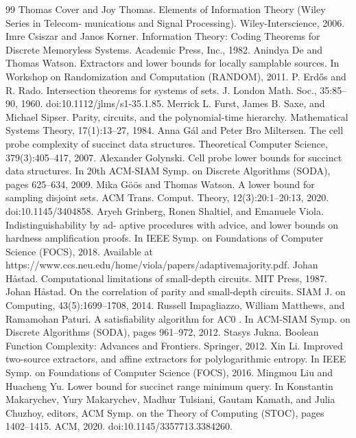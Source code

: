 \begin{thebibliography}{99}
 Thomas Cover and Joy Thomas. Elements of Information Theory (Wiley Series in Telecom- munications and Signal Processing). Wiley-Interscience, 2006.
 Imre Csiszar and Janos Korner. Information Theory: Coding Theorems for Discrete Memoryless Systems. Academic Press, Inc., 1982.
 Anindya De and Thomas Watson. Extractors and lower bounds for locally samplable sources. In Workshop on Randomization and Computation (RANDOM), 2011.
 P. Erdős and R. Rado. Intersection theorems for systems of sets. J. London Math. Soc., 35:85–90, 1960. doi:10.1112/jlms/s1-35.1.85.
 Merrick L. Furst, James B. Saxe, and Michael Sipser. Parity, circuits, and the polynomial-time hierarchy. Mathematical Systems Theory, 17(1):13–27, 1984.
 Anna Gál and Peter Bro Miltersen. The cell probe complexity of succinct data structures. Theoretical Computer Science, 379(3):405–417, 2007.
 Alexander Golynski. Cell probe lower bounds for succinct data structures. In 20th ACM-SIAM Symp. on Discrete Algorithms (SODA), pages 625–634, 2009.
 Mika Göös and Thomas Watson. A lower bound for sampling disjoint sets. ACM Trans. Comput. Theory, 12(3):20:1–20:13, 2020. doi:10.1145/3404858.
 Aryeh Grinberg, Ronen Shaltiel, and Emanuele Viola.               Indistinguishability by ad- aptive procedures with advice, and lower bounds on hardness amplification proofs. In IEEE Symp. on Foundations of Computer Science (FOCS), 2018.                    Available at https://www.ccs.neu.edu/home/viola/papers/adaptivemajority.pdf.
 Johan Håstad. Computational limitations of small-depth circuits. MIT Press, 1987.
 Johan Håstad. On the correlation of parity and small-depth circuits. SIAM J. on Computing, 43(5):1699–1708, 2014.
 Russell Impagliazzo, William Matthews, and Ramamohan Paturi. A satisfiability algorithm for AC0 . In ACM-SIAM Symp. on Discrete Algorithms (SODA), pages 961–972, 2012.
 Stasys Jukna. Boolean Function Complexity: Advances and Frontiers. Springer, 2012.
 Xin Li. Improved two-source extractors, and affine extractors for polylogarithmic entropy. In IEEE Symp. on Foundations of Computer Science (FOCS), 2016.
 Mingmou Liu and Huacheng Yu. Lower bound for succinct range minimum query. In Konstantin Makarychev, Yury Makarychev, Madhur Tulsiani, Gautam Kamath, and Julia Chuzhoy, editors, ACM Symp. on the Theory of Computing (STOC), pages 1402–1415. ACM, 2020. doi:10.1145/3357713.3384260.

\end{thebibliography}
